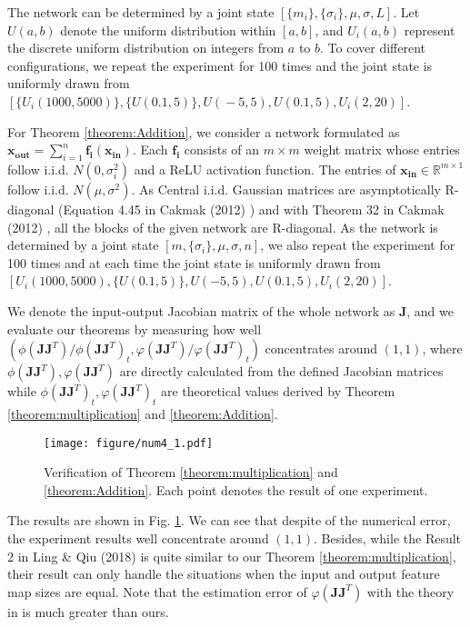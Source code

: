 \documentclass[10pt,journal,compsoc]{IEEEtran}
\begin{document}
The network can be determined by a joint state $\left[\{m_i\}, \{\sigma_i\}, \mu, \sigma, L\right]$. Let $U(a, b)$ denote the uniform distribution within $[a,b]$, and $U_{i}(a, b)$ represent the discrete uniform distribution on integers from $a$ to $b$. To cover different configurations, we repeat the experiment for 100 times and the joint state is uniformly drawn from $[\{U_{i}(1000, 5000)\},\! \{U(0.1, 5)\},\! U(\!-5,\! 5),\! U(0.1, 5), U_{i}(2, 20)]$.

For Theorem \ref{theorem:Addition}, we consider a network formulated as $\mathbf{x_{out}}=\sum_{i=1}^n\mathbf{f_i}(\mathbf{x_{in}})$. Each $\mathbf{f_i}$ consists of an $m\times m$ weight matrix whose entries follow i.i.d. $N(0, \sigma_i^2)$ and a ReLU activation function. The entries of $\mathbf{x_{in}}\in \mathbb{R}^{m\times 1}$ follow i.i.d. $N(\mu, \sigma^2)$. As Central i.i.d. Gaussian matrices are asymptotically R-diagonal (Equation 4.45 in Cakmak (2012) \cite{cakmak2012non}) and with Theorem 32 in Cakmak (2012) \cite{cakmak2012non}, all the blocks of the given network are R-diagonal. As the network is determined by a joint state $\left[ m, \{\sigma_i\}, \mu, \sigma, n\right]$, we also repeat the experiment for 100 times and at each time the joint state is uniformly drawn from $\left[U_{i}(1000, 5000), \{U(0.1, 5)\}, U(-5, 5), U(0.1, 5), U_{i}(2, 20)\right]$.

We denote the input-output Jacobian matrix of the whole network as $\mathbf{J}$, and we evaluate our theorems by measuring how well $\left(\phi(\mathbf{JJ}^T)/\phi(\mathbf{JJ}^T)_{t}, \varphi(\mathbf{JJ}^T)/\varphi(\mathbf{JJ}^T)_t\right)$ concentrates around $(1, 1)$, where $\phi(\mathbf{JJ}^T), \varphi(\mathbf{JJ}^T)$ are directly calculated from the defined Jacobian matrices while $\phi(\mathbf{JJ}^T)_t, \varphi(\mathbf{JJ}^T)_t$ are theoretical values derived by Theorem \ref{theorem:multiplication} and \ref{theorem:Addition}.

\begin{figure}[!htbp]
\vspace{-10pt}
\centering
\texttt{[image: figure/num4\_1.pdf]}
\caption{Verification of Theorem \ref{theorem:multiplication} and \ref{theorem:Addition}. Each point denotes the result of one experiment.}
\label{fig:num4_1}
\vspace{-5pt}
\end{figure}

The results are shown in Fig. \ref{fig:num4_1}. We can see that despite of the numerical error, the experiment results well concentrate around $(1, 1)$. Besides, while the Result 2 in Ling \& Qiu (2018) \cite{ling2018spectrum} is quite similar to our Theorem \ref{theorem:multiplication}, their result can only handle the situations when the input and output feature map sizes are equal. Note that the estimation error of $\varphi(\mathbf{JJ}^T)$ with the theory in \cite{ling2018spectrum} is much greater than ours. 
  
\end{document}
